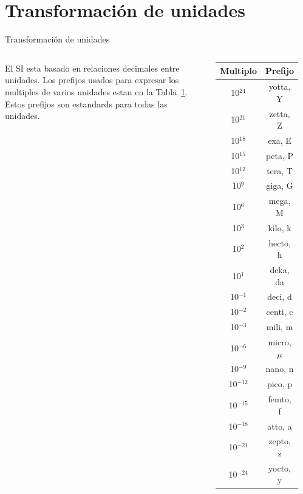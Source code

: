 \documentclass [xcolor=svgnames, t] {beamer}
\begin{document}
\section{Transformaci\'on de unidades}
\begin{frame}{Transformaci\'on de unidades}
\vspace{-1.0cm}
\begin{columns}
\begin{exampleblock}{}
El SI esta basado en relaciones decimales entre unidades. Los prefijos usados para expresar los multiples de varios unidades estan en la Tabla~\ref{t1}. Estos prefijos son estandards para todas las unidades.
\end{exampleblock}{}

\scriptsize
\begin{table}[h!]
\centering
\begin{tabular}{c c}
 \hline
 Multiplo & Prefijo \\ [0.5ex]
 \hline\hline
 10$^{24}$ & yotta, Y \\
 10$^{21}$ & zetta, Z \\
 10$^{18}$ & exa, E \\
 10$^{15}$ & peta, P \\
 10$^{12}$ & tera, T \\
 10$^{9}$ & giga, G \\
 10$^{6}$ & mega, M \\
 10$^{3}$ & kilo, k \\
 10$^{2}$ & hecto, h \\
 10$^{1}$ & deka, da \\
 10$^{-1}$ & deci, d \\
 10$^{-2}$ & centi, c \\
 10$^{-3}$ & mili, m \\
 10$^{-6}$ & micro, $\mu$ \\
 10$^{-9}$ & nano, n \\
 10$^{-12}$ & pico, p \\
 10$^{-15}$ & femto, f \\
 10$^{-18}$ & atto, a \\
 10$^{-21}$ & zepto, z \\
 10$^{-24}$ & yocto, y \\ [1ex]
  \hline
\end{tabular}
\label{t1}
\end{table}
\end{columns}
\end{frame}
\end{document}
